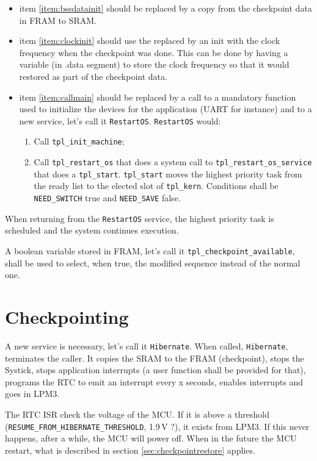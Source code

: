 \documentclass[11pt, oneside]{article}   	%
\begin{document}
\begin{itemize}
\item item \ref{item:bssdatainit} should be replaced by a copy from the checkpoint data in FRAM to SRAM.
\item item \ref{item:clockinit} should use the replaced by an init with the clock frequency when the checkpoint was done. This can be done by having a variable (in .data segment) to store the clock frequency so that it would restored as part of the checkpoint data.
\item item \ref{item:callmain} should be replaced by a call to a mandatory function used to initialize the devices for the application (UART for instance) and to a new service, let's call it \lstinline{RestartOS}. \lstinline{RestartOS} would:
	\begin{enumerate}
	\item Call \lstinline{tpl_init_machine};
	\item Call \lstinline{tpl_restart_os} that does a system call to \lstinline{tpl_restart_os_service} that does a \lstinline{tpl_start}. \lstinline{tpl_start} moves the highest priority task from the ready list to the elected slot of \lstinline{tpl_kern}. Conditions shall be \lstinline{NEED_SWITCH} true and \lstinline{NEED_SAVE} false.  
	\end{enumerate}
\end{itemize}

When returning from the \lstinline{RestartOS} service, the highest priority task is scheduled and the system continues execution.

A boolean variable stored in FRAM, let's call it \lstinline{tpl_checkpoint_available}, shall be used to select, when true, the modified sequence instead of the normal one.

\section{Checkpointing}\label{sec:checkpointing}

A new service is necessary, let's call it \lstinline{Hibernate}. When called, \lstinline{Hibernate}, terminates the caller. It copies the SRAM to the FRAM (checkpoint), stops the Systick, stops application interrupts (a user function shall be provided for that), programs the RTC to emit an interrupt every x seconds, enables interrupts and goes in LPM3. 

The RTC ISR check the voltage of the MCU. If it is above a threshold (\lstinline{RESUME_FROM_}\-\lstinline{HIBERNATE_THRESHOLD}, 1.9\,V ?), it exists from LPM3. If this never happens, after a while, the MCU will power off. When in the future the MCU restart, what is described in section \ref{sec:checkpointrestore} applies.  
\end{document}
